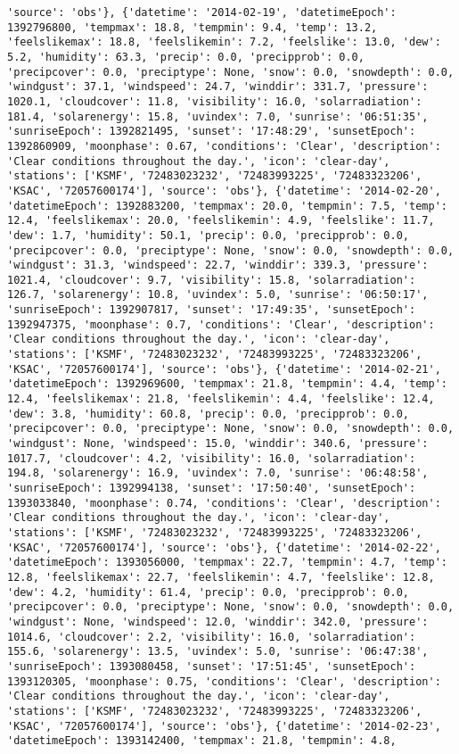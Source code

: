 \documentclass[
  letterpaper,
  DIV=11,
  numbers=noendperiod]{scrartcl}
\begin{document}
\begin{verbatim}
'source': 'obs'}, {'datetime': '2014-02-19', 'datetimeEpoch': 1392796800, 'tempmax': 18.8, 'tempmin': 9.4, 'temp': 13.2, 'feelslikemax': 18.8, 'feelslikemin': 7.2, 'feelslike': 13.0, 'dew': 5.2, 'humidity': 63.3, 'precip': 0.0, 'precipprob': 0.0, 'precipcover': 0.0, 'preciptype': None, 'snow': 0.0, 'snowdepth': 0.0, 'windgust': 37.1, 'windspeed': 24.7, 'winddir': 331.7, 'pressure': 1020.1, 'cloudcover': 11.8, 'visibility': 16.0, 'solarradiation': 181.4, 'solarenergy': 15.8, 'uvindex': 7.0, 'sunrise': '06:51:35', 'sunriseEpoch': 1392821495, 'sunset': '17:48:29', 'sunsetEpoch': 1392860909, 'moonphase': 0.67, 'conditions': 'Clear', 'description': 'Clear conditions throughout the day.', 'icon': 'clear-day', 'stations': ['KSMF', '72483023232', '72483993225', '72483323206', 'KSAC', '72057600174'], 'source': 'obs'}, {'datetime': '2014-02-20', 'datetimeEpoch': 1392883200, 'tempmax': 20.0, 'tempmin': 7.5, 'temp': 12.4, 'feelslikemax': 20.0, 'feelslikemin': 4.9, 'feelslike': 11.7, 'dew': 1.7, 'humidity': 50.1, 'precip': 0.0, 'precipprob': 0.0, 'precipcover': 0.0, 'preciptype': None, 'snow': 0.0, 'snowdepth': 0.0, 'windgust': 31.3, 'windspeed': 22.7, 'winddir': 339.3, 'pressure': 1021.4, 'cloudcover': 9.7, 'visibility': 15.8, 'solarradiation': 126.7, 'solarenergy': 10.8, 'uvindex': 5.0, 'sunrise': '06:50:17', 'sunriseEpoch': 1392907817, 'sunset': '17:49:35', 'sunsetEpoch': 1392947375, 'moonphase': 0.7, 'conditions': 'Clear', 'description': 'Clear conditions throughout the day.', 'icon': 'clear-day', 'stations': ['KSMF', '72483023232', '72483993225', '72483323206', 'KSAC', '72057600174'], 'source': 'obs'}, {'datetime': '2014-02-21', 'datetimeEpoch': 1392969600, 'tempmax': 21.8, 'tempmin': 4.4, 'temp': 12.4, 'feelslikemax': 21.8, 'feelslikemin': 4.4, 'feelslike': 12.4, 'dew': 3.8, 'humidity': 60.8, 'precip': 0.0, 'precipprob': 0.0, 'precipcover': 0.0, 'preciptype': None, 'snow': 0.0, 'snowdepth': 0.0, 'windgust': None, 'windspeed': 15.0, 'winddir': 340.6, 'pressure': 1017.7, 'cloudcover': 4.2, 'visibility': 16.0, 'solarradiation': 194.8, 'solarenergy': 16.9, 'uvindex': 7.0, 'sunrise': '06:48:58', 'sunriseEpoch': 1392994138, 'sunset': '17:50:40', 'sunsetEpoch': 1393033840, 'moonphase': 0.74, 'conditions': 'Clear', 'description': 'Clear conditions throughout the day.', 'icon': 'clear-day', 'stations': ['KSMF', '72483023232', '72483993225', '72483323206', 'KSAC', '72057600174'], 'source': 'obs'}, {'datetime': '2014-02-22', 'datetimeEpoch': 1393056000, 'tempmax': 22.7, 'tempmin': 4.7, 'temp': 12.8, 'feelslikemax': 22.7, 'feelslikemin': 4.7, 'feelslike': 12.8, 'dew': 4.2, 'humidity': 61.4, 'precip': 0.0, 'precipprob': 0.0, 'precipcover': 0.0, 'preciptype': None, 'snow': 0.0, 'snowdepth': 0.0, 'windgust': None, 'windspeed': 12.0, 'winddir': 342.0, 'pressure': 1014.6, 'cloudcover': 2.2, 'visibility': 16.0, 'solarradiation': 155.6, 'solarenergy': 13.5, 'uvindex': 5.0, 'sunrise': '06:47:38', 'sunriseEpoch': 1393080458, 'sunset': '17:51:45', 'sunsetEpoch': 1393120305, 'moonphase': 0.75, 'conditions': 'Clear', 'description': 'Clear conditions throughout the day.', 'icon': 'clear-day', 'stations': ['KSMF', '72483023232', '72483993225', '72483323206', 'KSAC', '72057600174'], 'source': 'obs'}, {'datetime': '2014-02-23', 'datetimeEpoch': 1393142400, 'tempmax': 21.8, 'tempmin': 4.8, 
\end{verbatim}
\end{document}
